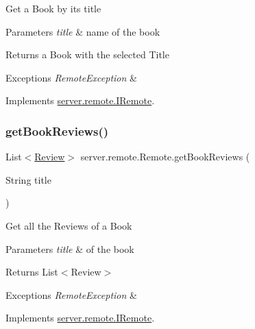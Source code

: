 Get a Book by its title 
\begin{DoxyParams}{Parameters}
{\em title} & name of the book \\
\hline
\end{DoxyParams}
\begin{DoxyReturn}{Returns}
a Book with the selected Title 
\end{DoxyReturn}

\begin{DoxyExceptions}{Exceptions}
{\em Remote\+Exception} & \\
\hline
\end{DoxyExceptions}


Implements \hyperlink{interfaceserver_1_1remote_1_1_i_remote_a520cc1af90d13264c14b32e19b5ce712}{server.\+remote.\+I\+Remote}.

\mbox{\label{classserver_1_1remote_1_1_remote_a501e5c5fe847917c9615f0772864a147}} 
\subsubsection{\texorpdfstring{get\+Book\+Reviews()}{getBookReviews()}}
{\footnotesize\ttfamily List$<$\hyperlink{classserver_1_1data_1_1_review}{Review}$>$ server.\+remote.\+Remote.\+get\+Book\+Reviews (\begin{DoxyParamCaption}\item[{String}]{title }\end{DoxyParamCaption})}

Get all the Reviews of a Book 
\begin{DoxyParams}{Parameters}
{\em title} & of the book \\
\hline
\end{DoxyParams}
\begin{DoxyReturn}{Returns}
List$<$\+Review$>$ 
\end{DoxyReturn}

\begin{DoxyExceptions}{Exceptions}
{\em Remote\+Exception} & \\
\hline
\end{DoxyExceptions}


Implements \hyperlink{interfaceserver_1_1remote_1_1_i_remote_a600254593b70d9757190475d3435b390}{server.\+remote.\+I\+Remote}.

